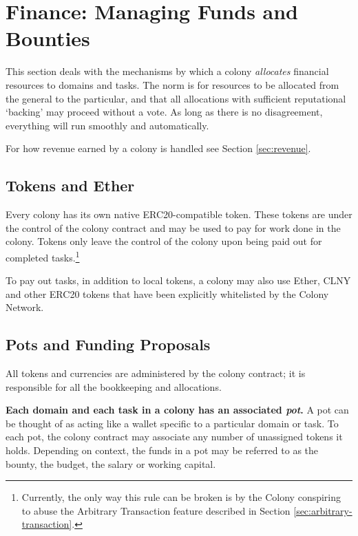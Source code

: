 

\section{Finance: Managing Funds and Bounties}\label{sec:finance}
This section deals with the mechanisms by which a colony \emph{allocates} financial resources to domains and tasks. The norm is for resources to be allocated from the general to the particular, and that all allocations with sufficient reputational `backing' may proceed without a vote. As long as there is no disagreement, everything will run smoothly and automatically.

For how revenue earned by a colony is handled see Section \ref{sec:revenue}.

\subsection{Tokens and Ether}
Every colony has its own native ERC20-compatible token. These tokens are under the control of the colony contract and may be used to pay for work done in the colony. Tokens only leave the control of the colony upon being paid out for completed tasks.\footnote{Currently, the only way this rule can be broken is by the Colony conspiring to abuse the Arbitrary Transaction feature described in Section \ref{sec:arbitrary-transaction}. }

To pay out tasks, in addition to local tokens, a colony may also use Ether, CLNY and other ERC20 tokens that have been explicitly whitelisted by the Colony Network.


\subsection{Pots and Funding Proposals}\label{sec:pots-and-fp}
All tokens and currencies are administered by the colony contract; it is responsible for all the bookkeeping and allocations.

\textbf{Each domain and each task in a colony has an associated \emph{pot}.} A pot can be thought of as acting like a wallet specific to a particular domain or task. To each pot, the colony contract may associate any number of unassigned tokens it holds. Depending on context, the funds in a pot may be referred to as the bounty, the budget, the salary or working capital.


